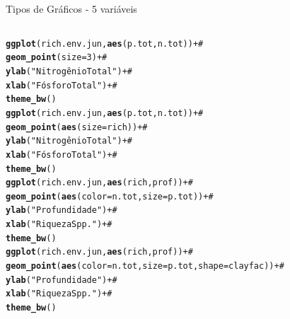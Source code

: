 \documentclass{beamer}\usepackage[]{graphicx}\usepackage[]{color}
\makeatletter
\newcommand{\hlnum}[1]{\textcolor[rgb]{0.686,0.059,0.569}{#1}}%
\newcommand{\hlstr}[1]{\textcolor[rgb]{0.192,0.494,0.8}{#1}}%
\newcommand{\hlcom}[1]{\textcolor[rgb]{0.678,0.584,0.686}{\textit{#1}}}%
\newcommand{\hlopt}[1]{\textcolor[rgb]{0,0,0}{#1}}%
\newcommand{\hlstd}[1]{\textcolor[rgb]{0.345,0.345,0.345}{#1}}%
\newcommand{\hlkwc}[1]{\textcolor[rgb]{0.333,0.667,0.333}{#1}}%
\newcommand{\hlkwd}[1]{\textcolor[rgb]{0.737,0.353,0.396}{\textbf{#1}}}%
\newenvironment{kframe}{%
 \def\at@end@of@kframe{}%
 \ifinner\ifhmode%
  \def\at@end@of@kframe{\end{minipage}}%
  \begin{minipage}{\columnwidth}%
 \fi\fi%
 \def\FrameCommand##1{\hskip\@totalleftmargin \hskip-\fboxsep
 \colorbox{shadecolor}{##1}\hskip-\fboxsep
     \hskip-\linewidth \hskip-\@totalleftmargin \hskip\columnwidth}%
 \MakeFramed {\advance\hsize-\width
   \@totalleftmargin\z@ \linewidth\hsize
   \@setminipage}}%
 {\par\unskip\endMakeFramed%
 \at@end@of@kframe}
\newenvironment{knitrout}{}{} %
\renewenvironment{knitrout}{\setlength{\topsep}{0mm}}{}
\makeatother
\begin{document}
\begin{frame}[fragile]{Tipos de Gráficos - 5 variáveis}

\begin{columns}[t]




\begin{knitrout}\tiny
{}\color{fgcolor}\begin{kframe}
\begin{alltt}
\hlkwd{ggplot}\hlstd{(rich.env.jun,}\hlkwd{aes}\hlstd{(p.tot,n.tot))} \hlopt{+}\hlcom{#}
  \hlkwd{geom_point}\hlstd{(}\hlkwc{size}\hlstd{=}\hlnum{3}\hlstd{)} \hlopt{+}\hlcom{#}
  \hlkwd{ylab}\hlstd{(}\hlstr{"Nitrogênio Total"}\hlstd{)} \hlopt{+}\hlcom{#}
  \hlkwd{xlab}\hlstd{(}\hlstr{"Fósforo Total"}\hlstd{)} \hlopt{+}\hlcom{#}
  \hlkwd{theme_bw}\hlstd{()}
\hlkwd{ggplot}\hlstd{(rich.env.jun,}\hlkwd{aes}\hlstd{(p.tot,n.tot))} \hlopt{+}\hlcom{#}
  \hlkwd{geom_point}\hlstd{(}\hlkwd{aes}\hlstd{(}\hlkwc{size}\hlstd{=rich))} \hlopt{+}\hlcom{#}
  \hlkwd{ylab}\hlstd{(}\hlstr{"Nitrogênio Total"}\hlstd{)} \hlopt{+}\hlcom{#}
  \hlkwd{xlab}\hlstd{(}\hlstr{"Fósforo Total"}\hlstd{)} \hlopt{+}\hlcom{#}
  \hlkwd{theme_bw}\hlstd{()}
\hlkwd{ggplot}\hlstd{(rich.env.jun,}\hlkwd{aes}\hlstd{(rich,prof))} \hlopt{+}\hlcom{#}
  \hlkwd{geom_point}\hlstd{(}\hlkwd{aes}\hlstd{(}\hlkwc{color}\hlstd{=n.tot,} \hlkwc{size}\hlstd{=p.tot))} \hlopt{+}\hlcom{#}
  \hlkwd{ylab}\hlstd{(}\hlstr{"Profundidade"}\hlstd{)} \hlopt{+}\hlcom{#}
  \hlkwd{xlab}\hlstd{(}\hlstr{"Riqueza Spp."}\hlstd{)} \hlopt{+}\hlcom{#}
  \hlkwd{theme_bw}\hlstd{()}
\hlkwd{ggplot}\hlstd{(rich.env.jun,}\hlkwd{aes}\hlstd{(rich,prof))} \hlopt{+}\hlcom{#}
  \hlkwd{geom_point}\hlstd{(}\hlkwd{aes}\hlstd{(}\hlkwc{color}\hlstd{=n.tot,} \hlkwc{size}\hlstd{=p.tot,} \hlkwc{shape}\hlstd{=clayfac))} \hlopt{+}\hlcom{#}
  \hlkwd{ylab}\hlstd{(}\hlstr{"Profundidade"}\hlstd{)} \hlopt{+}\hlcom{#}
  \hlkwd{xlab}\hlstd{(}\hlstr{"Riqueza Spp."}\hlstd{)} \hlopt{+}\hlcom{#}
  \hlkwd{theme_bw}\hlstd{()}
\end{alltt}
\end{kframe}
\end{knitrout}



\end{columns}
\end{frame}
\end{document}
